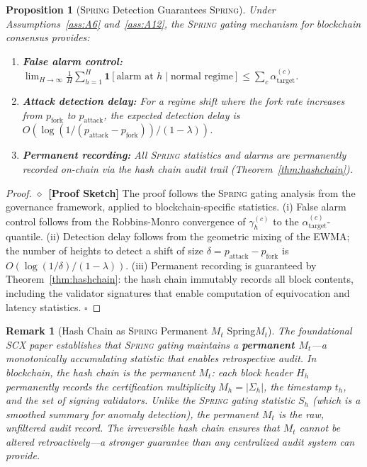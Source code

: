 \documentclass[11pt,a4paper]{article}
\newtheorem{proposition}[theorem]{Proposition}
\newtheorem{remark}[theorem]{Remark}
\theoremstyle{definition}
\newcommand{\rigorSketch}[0]{$\diamond$~\textbf{[Proof Sketch]}}
\newcommand{\Spring}{\textsc{Spring}}
\newcommand{\SCX}{\textsc{SCX}}
\newcommand{\ind}[1]{\mathbf{1}[#1]}
\begin{document}
\begin{proposition}[\Spring{} Detection Guarantees \Spring{}]
\label{prop:spring_guarantees}
Under Assumptions~\ref{ass:A6} and~\ref{ass:A12}, the \Spring{} gating mechanism for blockchain consensus provides:
\begin{enumerate}[label=(\roman*)]
    \item \textbf{False alarm control:} $\lim_{H \to \infty} \frac{1}{H} \sum_{h=1}^{H} \ind{\text{alarm at } h \mid \text{normal regime}} \leq \sum_c \alpha_{\mathrm{target}}^{(c)}$.
    \item \textbf{Attack detection delay:} For a regime shift where the fork rate increases from $p_{\mathrm{fork}}$ to $p_{\mathrm{attack}}$, the expected detection delay is $O(\log(1/(p_{\mathrm{attack}} - p_{\mathrm{fork}})) / (1-\lambda))$.
    \item \textbf{Permanent recording:} All \Spring{} statistics and alarms are permanently recorded on-chain via the hash chain audit trail (Theorem~\ref{thm:hashchain}).
\end{enumerate}
\end{proposition}
\begin{proof}\rigorSketch
The proof follows the \Spring{} gating analysis from the governance framework, applied to blockchain-specific statistics. (i) False alarm control follows from the Robbins-Monro convergence of $\gamma_h^{(c)}$ to the $\alpha_{\mathrm{target}}^{(c)}$-quantile. (ii) Detection delay follows from the geometric mixing of the EWMA; the number of heights to detect a shift of size $\delta = p_{\mathrm{attack}} - p_{\mathrm{fork}}$ is $O(\log(1/\delta) / (1-\lambda))$. (iii) Permanent recording is guaranteed by Theorem~\ref{thm:hashchain}: the hash chain immutably records all block contents, including the validator signatures that enable computation of equivocation and latency statistics. $\square$
\end{proof}
\begin{remark}[Hash Chain as \Spring{} Permanent $M_t$ Spring$M_t$]
\label{rem:spring_permanent_Mt}
The foundational \SCX{} paper establishes that \Spring{} gating maintains a \textbf{permanent $M_t$}—a monotonically accumulating statistic that enables retrospective audit. In blockchain, the hash chain \textit{is} the permanent $M_t$: each block header $H_h$ permanently records the certification multiplicity $M_h = |\Sigma_h|$, the timestamp $t_h$, and the set of signing validators. Unlike the \Spring{} gating statistic $S_h$ (which is a smoothed summary for anomaly detection), the permanent $M_t$ is the raw, unfiltered audit record. The irreversible hash chain ensures that $M_t$ cannot be altered retroactively—a stronger guarantee than any centralized audit system can provide.
\end{remark}
\end{document}
